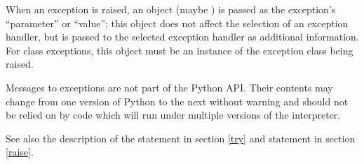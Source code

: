 When an exception is raised, an object (maybe ) is passed
as the exception's ``parameter'' or ``value''; this object does not
affect the selection of an exception handler, but is passed to the
selected exception handler as additional information.  For class
exceptions, this object must be an instance of the exception class
being raised.

\begin{notice}[warning]
Messages to exceptions are not part of the Python API.  Their contents may
change from one version of Python to the next without warning and should not
be relied on by code which will run under multiple versions of the
interpreter.
\end{notice}

See also the description of the  statement in section
\ref{try} and  statement in section \ref{raise}.
